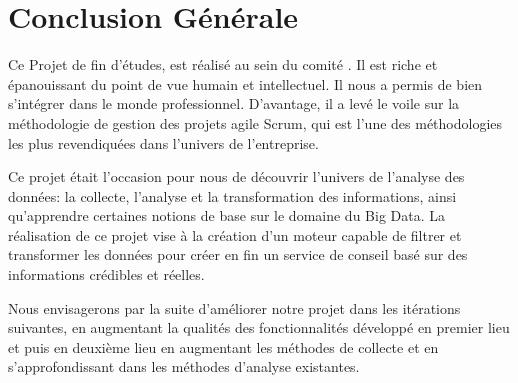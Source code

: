 \chapter*{Conclusion Générale}




Ce Projet de fin d’études, est réalisé au sein du comité .  Il est riche et épanouissant du point de vue humain et intellectuel.
Il nous a permis de bien s’intégrer dans le monde professionnel.  D’avantage,
il a levé le voile sur la méthodologie de gestion des projets agile Scrum, qui
est l’une des méthodologies les plus revendiquées dans l’univers de
l’entreprise.

Ce projet était l’occasion pour nous de découvrir l’univers de l'analyse des
données: la collecte, l'analyse et la transformation des informations, ainsi
qu’apprendre certaines notions de base sur le domaine du Big Data.  La
réalisation de ce  projet vise à la création d'un moteur capable de filtrer et
transformer les données pour créer en fin un service de conseil basé sur des
informations crédibles et réelles.

Nous envisagerons par la suite d’améliorer notre projet dans les itérations
suivantes, en augmentant la qualités des fonctionnalités développé en premier
lieu et puis en deuxième lieu en augmentant les méthodes de collecte et en
s'approfondissant dans les méthodes d'analyse existantes.
